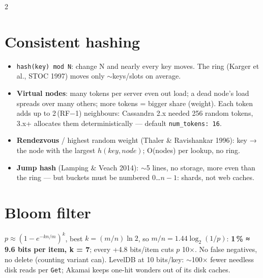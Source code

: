 \documentclass[8pt]{extarticle}
\newcommand\ct[1]{\texttt{#1}}
\begin{document}
\begin{multicols}{2}
\section{Consistent hashing}
\begin{itemize}
  \item \ct{hash(key) mod N}: change N and nearly every key moves. The ring (Karger et al.,
        STOC 1997) moves only $\sim$keys/slots on average.
  \item \textbf{Virtual nodes}: many tokens per server even out load; a dead node's load spreads
        over many others; more tokens = bigger share (weight). Each token adds up to
        2\,(RF$-$1) neighbours: Cassandra 2.x needed 256 random tokens, 3.x+ allocates them
        deterministically — default \ct{num\_tokens: 16}.
  \item \textbf{Rendezvous} / highest random weight (Thaler \& Ravishankar 1996): key → the node
        with the largest $h(key, node)$; O(nodes) per lookup, no ring.
  \item \textbf{Jump hash} (Lamping \& Veach 2014): $\sim$5 lines, no storage, more even than
        the ring — but buckets must be numbered 0…$n{-}1$: shards, not web caches.
\end{itemize}

\section{Bloom filter}
$p \approx (1-e^{-kn/m})^k$, best $k = (m/n)\ln 2$, so $m/n = 1.44\log_2(1/p)$:
\textbf{1\,\% ≈ 9.6 bits per item, k = 7}; every +4.8 bits/item cuts $p$ 10$\times$. No false
negatives, no delete (counting variant can). LevelDB at 10 bits/key: $\sim$100$\times$ fewer
needless disk reads per \ct{Get}; Akamai keeps one-hit wonders out of its disk caches.

\columnbreak


\end{multicols}
\end{document}
